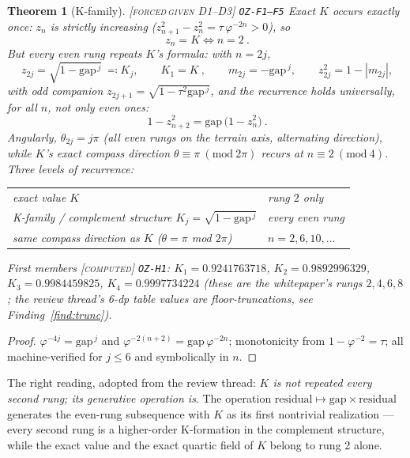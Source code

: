 \documentclass[11pt]{article}
\newcommand{\tagFD}{\textcolor{cF}{\textsc{[forced}}\,\textcolor{cD}{\textsc{given D1--D3]}}}
\newcommand{\tagC}{\textcolor{cC}{\textsc{[computed]}}}
\newcommand{\hx}[1]{\textcolor{cC}{\footnotesize\texttt{#1}}}
\newcommand{\gp}{\varphi}
\newcommand{\gapc}{\mathrm{gap}}
\theoremstyle{plain}
\newtheorem{theorem}{Theorem}[section]
\theoremstyle{definition}
\theoremstyle{remark}
\begin{document}
\begin{theorem}[K-family]\label{thm:kfamily}\tagFD{} \hx{OZ-F1--F5}
Exact $K$ occurs exactly once: $z_n$ is strictly increasing
($z_{n+1}^2-z_n^2=\tau\,\gp^{-2n}>0$), so
\[
\boxed{\ z_n=K\iff n=2\ }.
\]
But every even rung repeats $K$'s \emph{formula}: with $n=2j$,
\[
\boxed{\ z_{2j}=\sqrt{1-\gapc^{\,j}}\ \eqqcolon K_j,\qquad K_1=K\ },
\qquad
m_{2j}=-\gapc^{\,j},\qquad z_{2j}^2=1-|m_{2j}|,
\]
with odd companion $z_{2j+1}=\sqrt{1-\tau^2\gapc^{\,j}}$, and the recurrence
holds universally, for \emph{all} $n$, not only even ones:
\[
\boxed{\ 1-z_{n+2}^2=\gapc\,\bigl(1-z_n^2\bigr)\ }.
\]
Angularly, $\theta_{2j}=j\pi$ (all even rungs on the terrain axis, alternating
direction), while $K$'s exact compass direction $\theta\equiv\pi\ (\mathrm{mod}\
2\pi)$ recurs at $n\equiv2\ (\mathrm{mod}\ 4)$. Three levels of recurrence:
\begin{center}\small
\begin{tabular}{@{}ll@{}}
\toprule
exact value $K$ & rung $2$ only\\
K-family / complement structure $K_j=\sqrt{1-\gapc^{\,j}}$ & every even rung\\
same compass direction as $K$ ($\theta=\pi$ mod $2\pi$) & $n=2,6,10,\ldots$\\
\bottomrule
\end{tabular}
\end{center}
First members \tagC{} \hx{OZ-H1}: $K_1=0.9241763718$, $K_2=0.9892996329$,
$K_3=0.9984459825$, $K_4=0.9997734224$ (these are the whitepaper's rungs
$2,4,6,8$; the review thread's 6-dp table values are floor-truncations, see
Finding~\ref{find:trunc}).
\end{theorem}

\begin{proof}
$\gp^{-4j}=\gapc^{\,j}$ and $\gp^{-2(n+2)}=\gapc\,\gp^{-2n}$; monotonicity from
$1-\gp^{-2}=\tau$; all machine-verified for $j\le6$ and symbolically in $n$.
\end{proof}

The right reading, adopted from the review thread: \emph{$K$ is not repeated
every second rung; its generative operation is}. The operation
$\text{residual}\mapsto\gapc\times\text{residual}$ generates the even-rung
subsequence with $K$ as its first nontrivial realization --- every second rung is
a higher-order K-formation in the complement structure, while the exact value and
the exact quartic field of $K$ belong to rung 2 alone.
\end{document}
